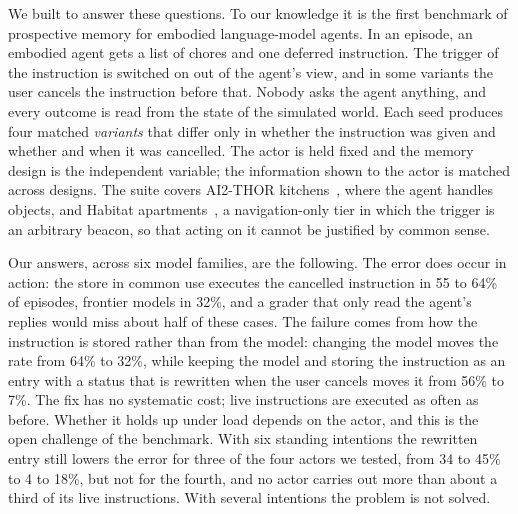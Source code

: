 We built \bench{} to answer these questions. To our knowledge it is the
first benchmark of prospective memory for embodied language-model agents. In
an episode, an embodied agent gets a list of chores and one deferred
instruction. The trigger of the instruction is switched on out of the
agent's view, and in some variants the user cancels the instruction before
that. Nobody asks the agent anything, and every outcome is read from the
state of the simulated world. Each seed produces four matched
\emph{variants} that differ only in whether the instruction was given and
whether and when it was cancelled. The actor is held fixed and the memory
design is the independent variable; the information shown to the actor is
matched across designs. The suite covers AI2-THOR
kitchens~\cite{kolve2017ai2thor}, where the agent handles objects, and
Habitat apartments~\cite{savva2019habitat}, a navigation-only tier in which
the trigger is an arbitrary beacon, so that acting on it cannot be
justified by common sense.

Our answers, across six model families, are the following. The error does
occur in action: the store in common use executes the cancelled instruction
in 55 to 64\% of episodes, frontier models in 32\%, and a grader that only
read the agent's replies would miss about half of these cases. The failure
comes from how the instruction is stored rather than from the model:
changing the model moves the rate from 64\% to 32\%, while keeping the
model and storing the instruction as an entry with a status that is
rewritten when the user cancels moves it from 56\% to 7\%. The fix has no
systematic cost; live instructions are executed as often as before. Whether
it holds up under load depends on the actor, and this is the open challenge
of the benchmark. With six standing intentions the rewritten entry
still lowers the error for three of the four actors we tested, from 34 to
45\% to 4 to 18\%, but not for the fourth, and no actor carries out more
than about a third of its live instructions. With several intentions the
problem is not solved.

